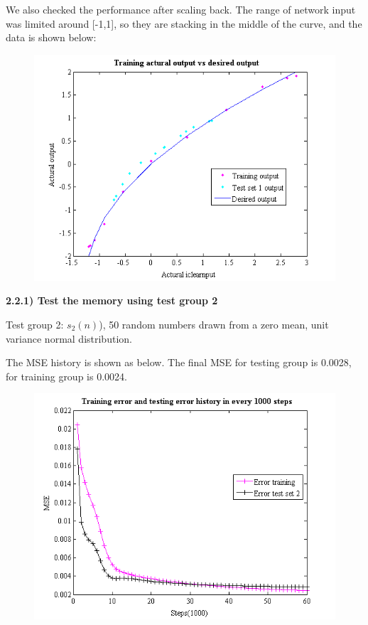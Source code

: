 \documentclass[epsfig]{article}
\def\bpar{\vskip26pt}
\def\npar{\vskip13pt}
\begin{document}
We also checked the performance after scaling back. The range of network input was limited around [-1,1], so they are stacking in the middle of the curve, and the data is shown below:

\begin{figure}[!htb] 
\centering\includegraphics[width=4.5in]{output_test1_rs.png} 
\end{figure} 


\clearpage

{\bf 
\npar
2.2.1) Test the memory using test group 2

\bpar
}


Test group 2: $s_2{(n)}$), 50 random numbers drawn from a zero mean, unit variance normal distribution.


The MSE history is shown as below.  The final MSE for testing group is 0.0028, for training group is 0.0024.

\begin{figure}[!htb] 
\centering\includegraphics[width=4.5in]{err_test2.png} 
\end{figure} 
\end{document}
